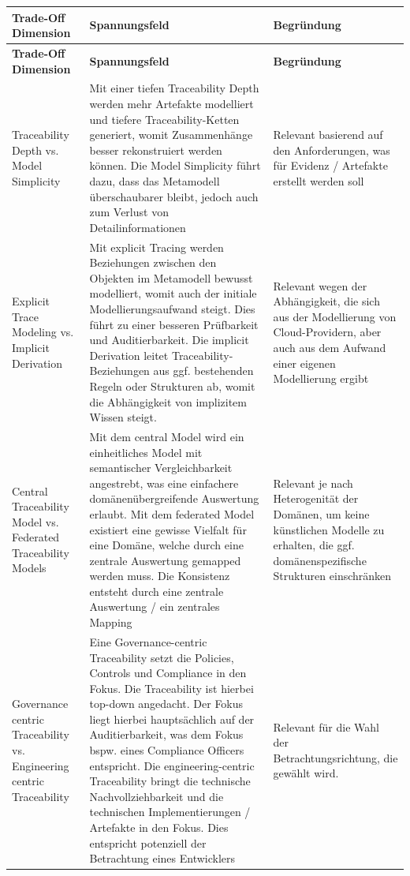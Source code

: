 \begin{longtable}{|
  L{3cm}|
  p{\dimexpr\textwidth-6cm-6\arrayrulewidth\relax}|
  L{3cm}|
}
    \hline
    \textbf{Trade-Off Dimension} & \textbf{Spannungsfeld} & \textbf{Begründung} \\
    \hline
    \endfirsthead

    \hline
    \textbf{Trade-Off Dimension} & \textbf{Spannungsfeld} & \textbf{Begründung} \\
    \hline
    \endhead
    
    Traceability Depth vs. Model Simplicity &
    Mit einer tiefen Traceability Depth werden mehr Artefakte modelliert und tiefere Traceability-Ketten generiert, womit Zusammenhänge besser rekonstruiert werden können. Die Model Simplicity führt dazu, dass das Metamodell überschaubarer bleibt, jedoch auch zum Verlust von Detailinformationen &
    Relevant basierend auf den Anforderungen, was für Evidenz / Artefakte erstellt werden soll
    \\
    \hline

    Explicit Trace Modeling vs. Implicit Derivation &
    Mit explicit Tracing werden Beziehungen zwischen den Objekten im Metamodell bewusst modelliert, womit auch der initiale Modellierungsaufwand steigt. Dies führt zu einer besseren Prüfbarkeit und Auditierbarkeit. Die implicit Derivation leitet Traceability-Beziehungen aus ggf. bestehenden Regeln oder Strukturen ab, womit die Abhängigkeit von implizitem Wissen steigt. &
    Relevant wegen der Abhängigkeit, die sich aus der Modellierung von Cloud-Providern, aber auch aus dem Aufwand einer eigenen Modellierung ergibt
    \\
    \hline

    Central Traceability Model vs. Federated Traceability Models &
    Mit dem central Model wird ein einheitliches Model mit semantischer Vergleichbarkeit angestrebt, was eine einfachere domänenübergreifende Auswertung erlaubt. Mit dem federated Model existiert eine gewisse Vielfalt für eine Domäne, welche durch eine zentrale Auswertung gemapped werden muss. Die Konsistenz entsteht durch eine zentrale Auswertung / ein zentrales Mapping &
    Relevant je nach Heterogenität der Domänen, um keine künstlichen Modelle zu erhalten, die ggf. domänenspezifische Strukturen einschränken
    \\
    \hline

    Governance centric Traceability vs. Engineering centric Traceability &
    Eine Governance-centric Traceability setzt die Policies, Controls und Compliance in den Fokus. Die Traceability ist hierbei top-down angedacht. Der Fokus liegt hierbei hauptsächlich auf der Auditierbarkeit, was dem Fokus bspw. eines Compliance Officers entspricht. Die engineering-centric Traceability bringt die technische Nachvollziehbarkeit und die technischen Implementierungen / Artefakte in den Fokus. Dies entspricht potenziell der Betrachtung eines Entwicklers &
    Relevant für die Wahl der Betrachtungsrichtung, die gewählt wird.
    \\
    \hline


\end{longtable}

